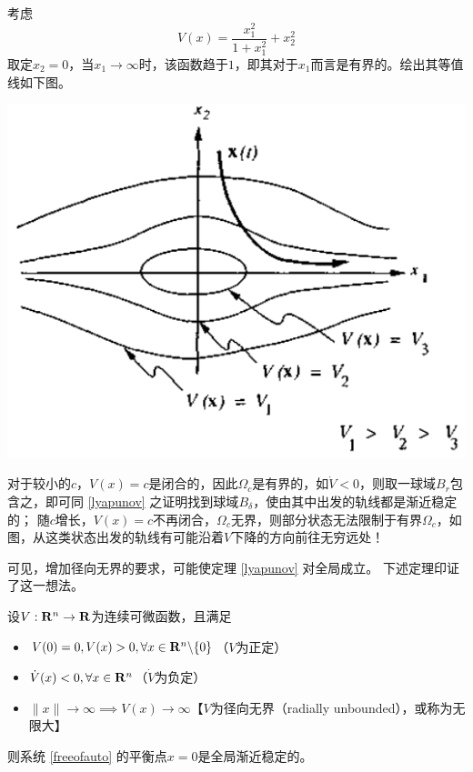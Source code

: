 \begin{example}[径向有界]
  考虑\[V(x)=\frac{x_1^2}{1+x_1^2}+x_2^2\]
  取定$x_2=0$，当$x_1\to\infty$时，该函数趋于$1$，即其对于$x_1$而言是有界的。绘出其等值线如下图。
\begin{center}
  \includegraphics[scale=0.5]{figure/nonlinear/descent_but_unstable.png}
\end{center}
  对于较小的$c$，$V(x)=c$是闭合的，因此$\Omega_c$是有界的，如$\dot{V}<0$，则取一球域$B_r$包含之，即可同 \ref{lyapunov} 之证明找到球域$B_\delta$，使由其中出发的轨线都是渐近稳定的；
  随$c$增长，$V(x)=c$不再闭合，$\Omega_c$无界，则部分状态无法限制于有界$\Omega_c$，如图，从这类状态出发的轨线有可能沿着$V$下降的方向前往无穷远处！
\end{example}
可见，增加径向无界的要求，可能使定理 \ref{lyapunov} 对全局成立。
下述定理印证了这一想法。
\begin{theorem}[全局渐近稳定定理]
  设$V:\mathbf{R}{}^n\to\mathbf{R}$为连续可微函数，且满足
    \begin{itemize}[leftmargin=1em]
      \item $V(0)=0,V(x)>0,\forall x\in \mathbf{R}{}^n\backslash\{0\}$（$V$为正定）
      \item $\dot{V}(x)< 0,\forall x\in \mathbf{R}{}^n$（$\dot{V}$为负定）
      \item $\|x\|\to\infty\implies V(x)\to \infty$【$V$为径向无界（radially unbounded），或称为无限大】
    \end{itemize}
  则系统 \eqref{freeofauto} 的平衡点$x=0$是全局渐近稳定的。
\end{theorem}
